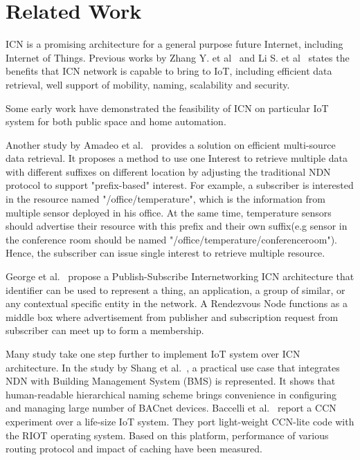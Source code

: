 \section{Related Work}
\label{sec:related}
ICN is a promising architecture for a general purpose future Internet, including Internet of Things. Previous works by Zhang Y. et al~\cite{zhang2013icn} and Li S. et al~\cite{compare_study} states the benefits that ICN network is capable to bring to IoT, including efficient data retrieval, well support of mobility, naming, scalability and security.

Some early work have demonstrated the feasibility of ICN on particular IoT system for both public space and home automation.  


Another study by Amadeo et al.~\cite{amadeo2014multi} provides a solution on efficient multi-source data retrieval. It proposes a method to use one Interest to retrieve multiple data with different suffixes on different location by adjusting the traditional NDN protocol to support "prefix-based" interest. For example, a subscriber is interested in the resource named "/office/temperature", which is the information from multiple sensor deployed in his office. At the same time, temperature sensors should advertise their resource with this prefix and their own suffix(e.g sensor in the conference room should be named "/office/temperature/conferenceroom"). Hence, the subscriber can issue single interest to retrieve multiple resource.


George et al.~\cite{polyzos2015building} propose a Publish-Subscribe Internetworking ICN architecture
that identifier can be used to represent a thing, an application, a group of similar, or any contextual specific entity in the network. A Rendezvous Node functions as a middle box where advertisement from publisher and subscription request from subscriber can meet up to form a membership. 

Many study take one step further to implement IoT system over ICN architecture. In the study by Shang et al.~\cite{shang2014securing}, a practical use case that integrates NDN with Building Management System (BMS) is represented. It shows that human-readable hierarchical naming scheme brings convenience in configuring and managing large number of BACnet devices. Baccelli et al.~\cite{baccelli2014information} report a CCN experiment over a life-size IoT system. They port light-weight CCN-lite code with the RIOT operating system. Based on this platform, performance of various routing protocol and impact of caching have been measured.  

